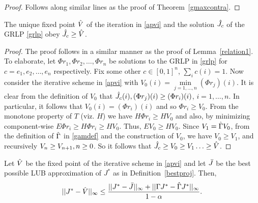 \begin{proof}
Follows along similar lines as the proof of Theorem~\ref{gmaxcontra}.
\end{proof}
\begin{lemma}\label{relation2}
The unique fixed point $\hat{V}$ of the iteration in \eqref{apvi} and the solution $\hat{J}_c$ of the GRLP \eqref{grlp} obey $\hat{J}_c\geq\hat{V}$.
\end{lemma}
\begin{proof}
The proof follows in a similar manner as the proof of Lemma~\ref{relation1}. To elaborate, let $\Phi r_1, \Phi r_2,\ldots,\Phi r_n$ be solutions to the GRLP in \eqref{grlp} for $c=e_1, e_2,\ldots,e_n$ respectively. Fix some other $c\in [0,1]^n$, $\sum_i c(i)=1$.
Now consider the iterative scheme in \eqref{apvi} with $V_0(i)=\underset{j=1,\ldots,n}{\min}(\Phi r_j)(i)$. 
It is clear from the definition of $V_0$ that $\hat{J}_c(i),(\Phi r_j)(i)\geq(\Phi r_i)(i)$, $i=1,\ldots,n$.
In particular, it follows that $V_0(i) =( \Phi r_i)(i)$ and so
$\Phi r_i \geq V_0$.
From the monotone property of $T$ (viz. $H$) we have 
$H\Phi r_i\geq H V_0$ and also, by minimizing component-wise
$E\Phi r_i\geq H\Phi r_i\geq HV_0$. Thus,
$E V_0\geq H V_0$. 
Since $V_1=\hat{\Gamma} V_0$, from the definition of $\hat{\Gamma}$ in \eqref{gamdef} and the construction of $V_0$, we have $V_0\geq V_1$, and recursively $V_{n}\geq V_{n+1}, \relax{ } n\geq 0$. So it follows that $\hat{J}_c\geq V_0\geq V_1\ldots\geq \hat{V}$.
\end{proof}
\begin{theorem}\label{mt1}
Let $\hat{V}$ be the fixed point of the iterative scheme in \eqref{apvi} and let $\bar{J}$ be the best possible LUB approximation of $J^*$ as in Definition~\ref{bestproj}. Then,
\begin{align}
||J^*-\hat{V}||_\infty\leq \frac{||J^*-\bar{J}||_\infty+||\Gamma J^*-\hat{\Gamma} J^*||_\infty}{1-\alpha}.
\end{align}
\end{theorem}
